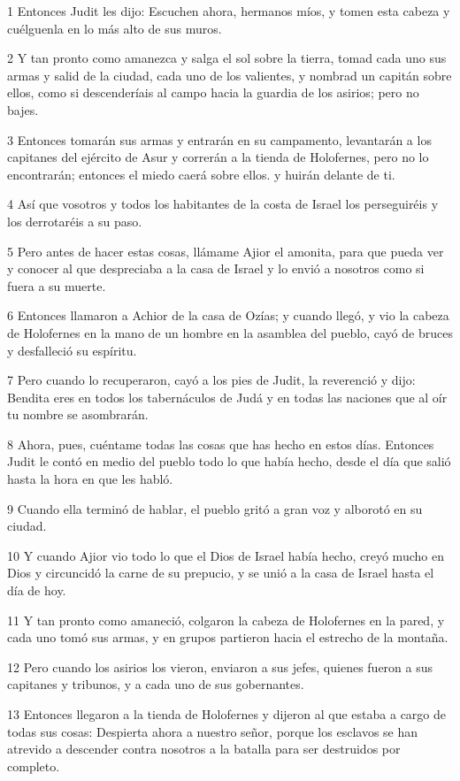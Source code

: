 \par 1 Entonces Judit les dijo: Escuchen ahora, hermanos míos, y tomen esta cabeza y cuélguenla en lo más alto de sus muros.
\par 2 Y tan pronto como amanezca y salga el sol sobre la tierra, tomad cada uno sus armas y salid de la ciudad, cada uno de los valientes, y nombrad un capitán sobre ellos, como si descenderíais al campo hacia la guardia de los asirios; pero no bajes.
\par 3 Entonces tomarán sus armas y entrarán en su campamento, levantarán a los capitanes del ejército de Asur y correrán a la tienda de Holofernes, pero no lo encontrarán; entonces el miedo caerá sobre ellos. y huirán delante de ti.
\par 4 Así que vosotros y todos los habitantes de la costa de Israel los perseguiréis y los derrotaréis a su paso.
\par 5 Pero antes de hacer estas cosas, llámame Ajior el amonita, para que pueda ver y conocer al que despreciaba a la casa de Israel y lo envió a nosotros como si fuera a su muerte.
\par 6 Entonces llamaron a Achior de la casa de Ozías; y cuando llegó, y vio la cabeza de Holofernes en la mano de un hombre en la asamblea del pueblo, cayó de bruces y desfalleció su espíritu.
\par 7 Pero cuando lo recuperaron, cayó a los pies de Judit, la reverenció y dijo: Bendita eres en todos los tabernáculos de Judá y en todas las naciones que al oír tu nombre se asombrarán.
\par 8 Ahora, pues, cuéntame todas las cosas que has hecho en estos días. Entonces Judit le contó en medio del pueblo todo lo que había hecho, desde el día que salió hasta la hora en que les habló.
\par 9 Cuando ella terminó de hablar, el pueblo gritó a gran voz y alborotó en su ciudad.
\par 10 Y cuando Ajior vio todo lo que el Dios de Israel había hecho, creyó mucho en Dios y circuncidó la carne de su prepucio, y se unió a la casa de Israel hasta el día de hoy.
\par 11 Y tan pronto como amaneció, colgaron la cabeza de Holofernes en la pared, y cada uno tomó sus armas, y en grupos partieron hacia el estrecho de la montaña.
\par 12 Pero cuando los asirios los vieron, enviaron a sus jefes, quienes fueron a sus capitanes y tribunos, y a cada uno de sus gobernantes.
\par 13 Entonces llegaron a la tienda de Holofernes y dijeron al que estaba a cargo de todas sus cosas: Despierta ahora a nuestro señor, porque los esclavos se han atrevido a descender contra nosotros a la batalla para ser destruidos por completo.
